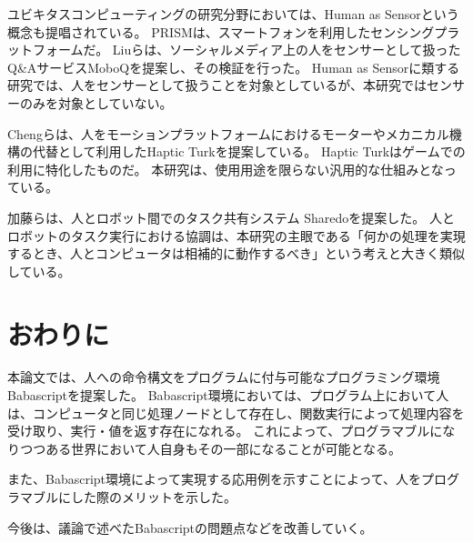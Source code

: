 ユビキタスコンピューティングの研究分野においては、Human as
Sensorという概念も提唱されている。
PRISMは、スマートフォンを利用したセンシングプラットフォームだ\cite{prism}。
Liuらは、ソーシャルメディア上の人をセンサーとして扱ったQ\&AサービスMoboQを提案し、その検証を行った。
Human as
Sensorに類する研究では、人をセンサーとして扱うことを対象としているが、本研究ではセンサーのみを対象としていない。

Chengらは、人をモーションプラットフォームにおけるモーターやメカニカル機構の代替として利用したHaptic
Turkを提案している\cite{hapticturk}。 Haptic
Turkはゲームでの利用に特化したものだ。
本研究は、使用用途を限らない汎用的な仕組みとなっている。

加藤らは、人とロボット間でのタスク共有システム
Sharedoを提案した\cite{sharedo}。
人とロボットのタスク実行における協調は、本研究の主眼である「何かの処理を実現するとき、人とコンピュータは相補的に動作するべき」という考えと大きく類似している。

\section{おわりに}\label{ux304aux308fux308aux306b}

本論文では、人への命令構文をプログラムに付与可能なプログラミング環境Babascriptを提案した。
Babascript環境においては、プログラム上において人は、コンピュータと同じ処理ノードとして存在し、関数実行によって処理内容を受け取り、実行・値を返す存在になれる。
これによって、プログラマブルになりつつある世界において人自身もその一部になることが可能となる。

また、Babascript環境によって実現する応用例を示すことによって、人をプログラマブルにした際のメリットを示した。

今後は、議論で述べたBabascriptの問題点などを改善していく。
